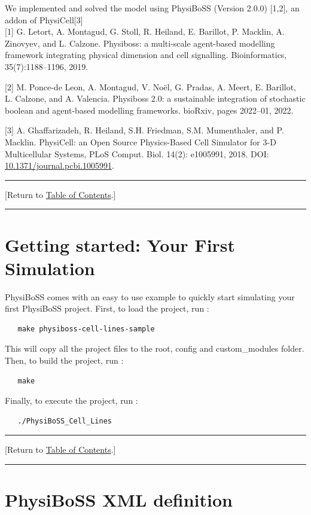 \documentclass[12pt]{article}
\newcommand{\Version}{2.0.0}
\newcommand{\TOClink}{\begin{center}\hrule\vskip-5pt\phantom{.}\hfill[Return to \hyperlink{TOC}{Table of Contents}.]\hfill\phantom{.}\vskip3pt\hrule\end{center}}
\begin{document}
\phantom{ }\hspace{.075\textwidth}\parbox[top]{0.85\textwidth}{%
We implemented and solved the model using PhysiBoSS (Version \Version) [1,2], an addon of PhysiCell[3] \\

[1] G. Letort, A. Montagud, G. Stoll, R. Heiland, E. Barillot, P. Macklin, A. Zinovyev, and L. Calzone.
Physiboss: a multi-scale agent-based modelling framework integrating physical dimension and cell
signalling. Bioinformatics, 35(7):1188–1196, 2019.


[2] M. Ponce-de Leon, A. Montagud, V. Noël, G. Pradas, A. Meert, E. Barillot, L. Calzone, and A. Valencia.
Physiboss 2.0: a sustainable integration of stochastic boolean and agent-based modelling frameworks.
bioRxiv, pages 2022–01, 2022.

[3] A. Ghaffarizadeh, R. Heiland, S.H. Friedman, S.M. Mumenthaler, and P. Macklin. PhysiCell: an Open Source Physics-Based Cell Simulator for 3-D Multicellular Systems, PLoS Comput. Biol. 14(2): e1005991, 2018. DOI: \href{https://dx.doi.org/10.1371/journal.pcbi.1005991}{10.1371/journal.pcbi.1005991}.
\\
}

\TOClink

\section{Getting started: Your First Simulation}
\label{sec:getting_started}

PhysiBoSS comes with an easy to use example to quickly start simulating your first PhysiBoSS project. First, to load the project, run : 

\begin{verbatim}
   make physiboss-cell-lines-sample
\end{verbatim}

This will copy all the project files to the root, config and custom\_modules folder. Then, to build the project, run : 

\begin{verbatim}
   make
\end{verbatim}

Finally, to execute the project, run : 

\begin{verbatim}
   ./PhysiBoSS_Cell_Lines
\end{verbatim}


\TOClink

\section{PhysiBoSS XML definition}
\label{sec:physiboss_xml_definitions}
\end{document}
